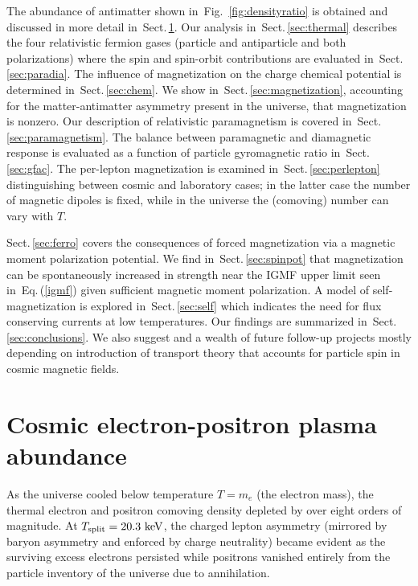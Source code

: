 \documentclass[aps,prd,floatfix,reprint]{revtex4-2}
\newcommand*{\keV}{\text{ keV}}
\newcommand{\req}[1]{Eq.\,(\ref{#1})}
\newcommand{\rf}[1]{Fig.~{\ref{#1}}}
\newcommand{\rsec}[1]{Sect.\,{\ref{#1}}}
\begin{document}
The abundance of antimatter shown in~\rf{fig:densityratio} is obtained and discussed in more detail in~\rsec{sec:abundance}. Our analysis in~\rsec{sec:thermal} describes the four relativistic fermion gases (particle and antiparticle and both polarizations) where the spin and spin-orbit contributions are evaluated in~\rsec{sec:paradia}. The influence of magnetization on the charge chemical potential is determined in~\rsec{sec:chem}.  We show in~\rsec{sec:magnetization}, accounting for the matter-antimatter asymmetry present in the universe, that magnetization is nonzero. Our description of relativistic paramagnetism is covered in~\rsec{sec:paramagnetism}. The balance between paramagnetic and diamagnetic response is evaluated as a function of particle gyromagnetic ratio in~\rsec{sec:gfac}. The per-lepton magnetization is examined in~\rsec{sec:perlepton} distinguishing between cosmic and laboratory cases; in the latter case the number of magnetic dipoles is fixed, while in the universe the (comoving) number can vary with $T$. 

\rsec{sec:ferro} covers the consequences of forced magnetization via a magnetic moment polarization potential. We find in~\rsec{sec:spinpot} that magnetization can be spontaneously increased in strength near the IGMF upper limit seen in~\req{igmf} given sufficient magnetic moment polarization. A model of self-magnetization is explored in~\rsec{sec:self} which indicates the need for flux conserving currents at low temperatures. Our findings are summarized in~\rsec{sec:conclusions}. We also suggest and a wealth of future follow-up projects mostly depending on introduction of transport theory that accounts for particle spin in cosmic magnetic fields.

\section{Cosmic electron-positron plasma abundance}
\label{sec:abundance}
\noindent As the universe cooled below temperature $T=m_{e}$ (the electron mass), the thermal electron and positron comoving density depleted by over eight orders of magnitude. At $T_{\rm split}=20.3\keV$, the charged lepton asymmetry (mirrored by baryon asymmetry and enforced by charge neutrality) became evident as the surviving excess electrons persisted while positrons vanished entirely from the particle inventory of the universe due to annihilation.
\end{document}
